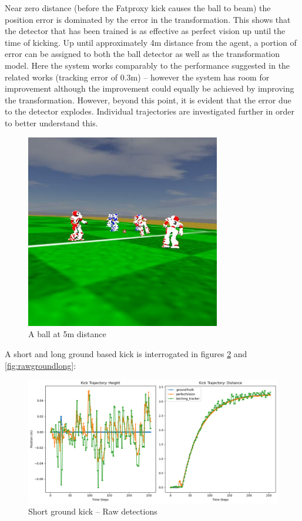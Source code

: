 \documentclass[a4paper,twoside,12pt]{report}
\begin{document}
Near zero distance (before the Fatproxy kick causes the ball to beam) the position error is dominated by the error in the transformation. This shows that the detector that has been trained is as effective as perfect vision up until the time of kicking. Up until approximately 4m distance from the agent, a portion of error can be assigned to both the ball detector as well as the transformation model. Here the system works comparably to the performance suggested in the related works (tracking error of 0.3m) -- however the system has room for improvement although the improvement could equally be achieved by improving the transformation. However, beyond this point, it is evident that the error due to the detector explodes. Individual trajectories are investigated further in order to better understand this.

\begin{figure}[h!]
\begin{center}
\includegraphics[width=8.5cm]{images/5mball.jpeg}
\caption{A ball at 5m distance}
\label{fig:farball}
\end{center}
\end{figure}

A short and long ground based kick is interrogated in figures \ref{fig:rawgroundshort} and \ref{fig:rawgroundlong}:

\begin{figure}[h!]
\begin{center}
\includegraphics[width=14cm]{images/raw_ground_short.png}
\caption{Short ground kick -- Raw detections}
\label{fig:rawgroundshort}
\end{center}
\end{figure}
\end{document}
